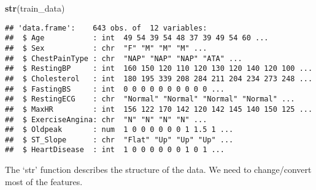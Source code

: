 \documentclass[
]{article}
\newenvironment{Shaded}{\begin{snugshade}}{\end{snugshade}}
\newcommand{\CommentTok}[1]{\textcolor[rgb]{0.56,0.35,0.01}{\textit{#1}}}
\newcommand{\DecValTok}[1]{\textcolor[rgb]{0.00,0.00,0.81}{#1}}
\newcommand{\FunctionTok}[1]{\textcolor[rgb]{0.13,0.29,0.53}{\textbf{#1}}}
\newcommand{\NormalTok}[1]{#1}
\newcommand{\OtherTok}[1]{\textcolor[rgb]{0.56,0.35,0.01}{#1}}
\newcommand{\SpecialCharTok}[1]{\textcolor[rgb]{0.81,0.36,0.00}{\textbf{#1}}}
\newcommand{\StringTok}[1]{\textcolor[rgb]{0.31,0.60,0.02}{#1}}
\begin{document}
\begin{Shaded}
\begin{Highlighting}[]
\FunctionTok{str}\NormalTok{(train\_data)}
\end{Highlighting}
\end{Shaded}

\begin{verbatim}
## 'data.frame':    643 obs. of  12 variables:
##  $ Age           : int  49 54 39 54 48 37 39 49 54 60 ...
##  $ Sex           : chr  "F" "M" "M" "M" ...
##  $ ChestPainType : chr  "NAP" "NAP" "NAP" "ATA" ...
##  $ RestingBP     : int  160 150 120 110 120 130 120 140 120 100 ...
##  $ Cholesterol   : int  180 195 339 208 284 211 204 234 273 248 ...
##  $ FastingBS     : int  0 0 0 0 0 0 0 0 0 0 ...
##  $ RestingECG    : chr  "Normal" "Normal" "Normal" "Normal" ...
##  $ MaxHR         : int  156 122 170 142 120 142 145 140 150 125 ...
##  $ ExerciseAngina: chr  "N" "N" "N" "N" ...
##  $ Oldpeak       : num  1 0 0 0 0 0 0 1 1.5 1 ...
##  $ ST_Slope      : chr  "Flat" "Up" "Up" "Up" ...
##  $ HeartDisease  : int  1 0 0 0 0 0 0 1 0 1 ...
\end{verbatim}

The `str' function describes the structure of the data. We need to
change/convert most of the features.

\begin{Shaded}
\end{Shaded}
\end{document}
